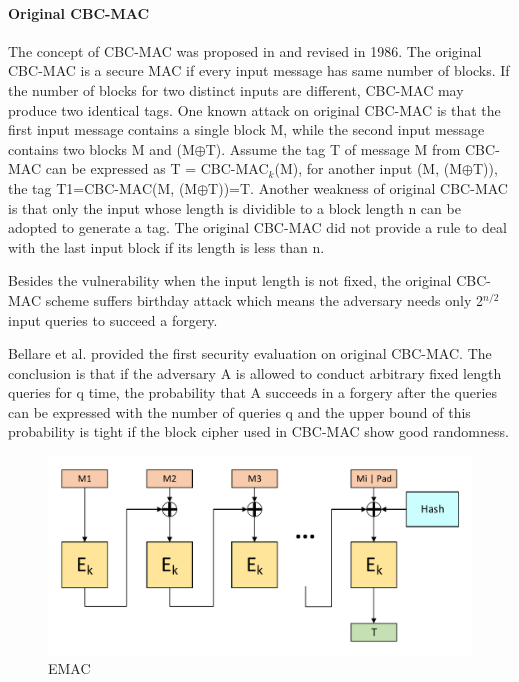 \documentclass{article}
\begin{document}
\paragraph{Original CBC-MAC}
The concept of CBC-MAC was proposed in \cite{} and revised in 1986. The original CBC-MAC is a secure MAC if every input message has same number of blocks. If the number of blocks for two distinct inputs are different, CBC-MAC may produce two identical tags. One known attack on original CBC-MAC is that the first input message contains a single block M, while the second input message contains two blocks M and (M$\oplus$T). Assume the tag T of message M from CBC-MAC can be expressed as T = CBC-MAC$_k$(M), for another input (M, (M$\oplus$T)), the tag T1=CBC-MAC(M, (M$\oplus$T))=T. 
Another weakness of original CBC-MAC is that only the input whose length is dividible to a block length n can be adopted to generate a tag. The original CBC-MAC did not provide a rule to deal with the last input block if its length is less than n.   

Besides the vulnerability when the input length is not fixed, the original CBC-MAC scheme suffers birthday attack which means the adversary needs only 2$^{n/2}$ input queries to succeed a forgery. 

Bellare et al. provided the first security evaluation on original CBC-MAC\cite{cbc1994}. The conclusion is that if the adversary A is allowed to conduct arbitrary fixed length queries for q time, the probability that A succeeds in a forgery after the queries can be expressed with the number of queries q and the upper bound of this probability is tight if the block cipher used in CBC-MAC show good randomness.  
\begin{figure}[htbp]
\centering
\includegraphics[scale=0.5]{./diagrams/cmac.pdf}
\caption{EMAC}
\label{fig:EMAC}
\end{figure}
\end{document}
